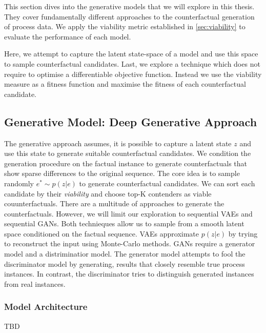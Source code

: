 \documentclass[./../../paper.tex]{subfiles}
\begin{document}
This section dives into the generative models that we will explore in this thesis. They cover fundamentally different approaches to the counterfactual generation of process data. We apply the viability metric established in \autoref{sec:viability} to evaluate the performance of each model.


Here, we attempt to capture the latent state-space of a model and use this space to sample counterfactual candidates.  Last, we explore a technique which does not require to optimise a differentiable objective function. Instead we use the viability measure as a fitness function and maximise the fitness of each counterfactual candidate.



\subsection{Generative Model: Deep Generative Approach}
The generative approach assumes, it is possible to capture a latent state $z$ and use this state to generate suitable counterfactual candidates. We condition the generation procedure on the factual instance to generate counterfactuals that show sparse differences to the original sequence. The core idea is to sample randomly $e^* \sim p(z|e)$ to generate counterfactual candidates. We can sort each candidate by their \emph{viability} and choose top-K contenders as viable couunterfactuals. There are a multitude of approaches to generate the counterfactuals. However, we will limit our exploration to sequential \glspl{VAE} and sequential \glspl{GAN}. Both technieques allow us to sample from a smooth latent space conditioned on the factual sequence. \glspl{VAE} approximate $p(z|e)$ by trying to reconstruct the input using Monte-Carlo methods. \glspl{GAN} require a generator model and a distriminatior model. The generator model attempts to fool the discriminator model by generating, results that closely resemble true process instances. In contrast, the discriminator tries to distinguish generated instances from real instances.

\subsubsection{Model Architecture}
TBD
\end{document}
